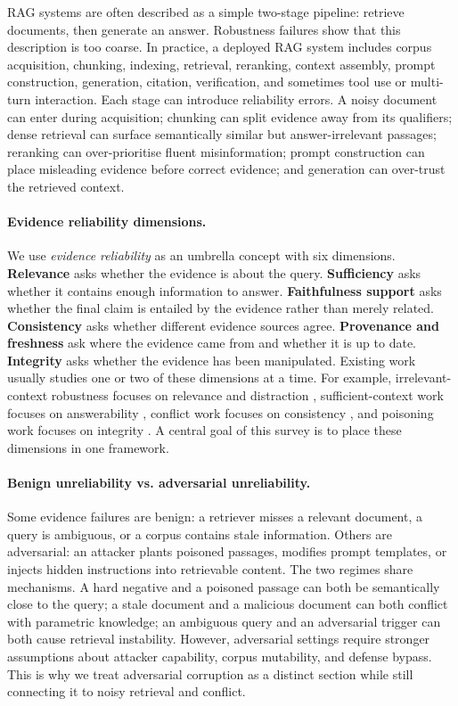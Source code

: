 
RAG systems are often described as a simple two-stage pipeline: retrieve documents, then generate an answer. Robustness failures show that this description is too coarse. In practice, a deployed RAG system includes corpus acquisition, chunking, indexing, retrieval, reranking, context assembly, prompt construction, generation, citation, verification, and sometimes tool use or multi-turn interaction. Each stage can introduce reliability errors. A noisy document can enter during acquisition; chunking can split evidence away from its qualifiers; dense retrieval can surface semantically similar but answer-irrelevant passages; reranking can over-prioritise fluent misinformation; prompt construction can place misleading evidence before correct evidence; and generation can over-trust the retrieved context.

\paragraph{Evidence reliability dimensions.}
We use \emph{evidence reliability} as an umbrella concept with six dimensions. \textbf{Relevance} asks whether the evidence is about the query. \textbf{Sufficiency} asks whether it contains enough information to answer. \textbf{Faithfulness support} asks whether the final claim is entailed by the evidence rather than merely related. \textbf{Consistency} asks whether different evidence sources agree. \textbf{Provenance and freshness} ask where the evidence came from and whether it is up to date. \textbf{Integrity} asks whether the evidence has been manipulated. Existing work usually studies one or two of these dimensions at a time. For example, irrelevant-context robustness focuses on relevance and distraction \citep{irrelevantContext2023}, sufficient-context work focuses on answerability \citep{sufficientContext2024}, conflict work focuses on consistency \citep{tugOfWar2024,faithfulRAG2025}, and poisoning work focuses on integrity \citep{poisonedRAG2024,badRAG2024}. A central goal of this survey is to place these dimensions in one framework.

\paragraph{Benign unreliability vs. adversarial unreliability.}
Some evidence failures are benign: a retriever misses a relevant document, a query is ambiguous, or a corpus contains stale information. Others are adversarial: an attacker plants poisoned passages, modifies prompt templates, or injects hidden instructions into retrievable content. The two regimes share mechanisms. A hard negative and a poisoned passage can both be semantically close to the query; a stale document and a malicious document can both conflict with parametric knowledge; an ambiguous query and an adversarial trigger can both cause retrieval instability. However, adversarial settings require stronger assumptions about attacker capability, corpus mutability, and defense bypass. This is why we treat adversarial corruption as a distinct section while still connecting it to noisy retrieval and conflict.

